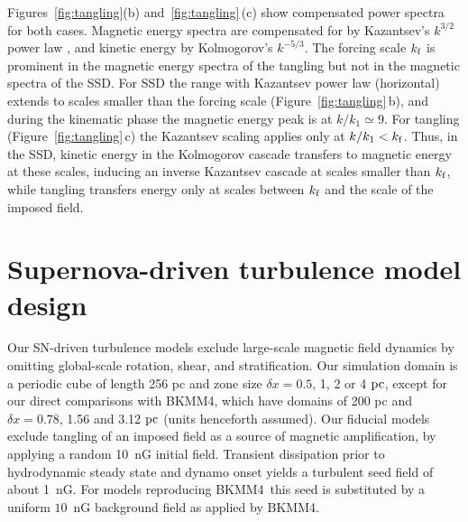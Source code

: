 \documentclass[preprint2]{aastex63}
\newcommand\kf{k_{\rm f} }
\newcommand\pc{~ {\rm pc}}
\newcommand\dx{ {\delta x}}
\newcommand\BKM{{\sf BKMM4}}
\begin{document}
 {Figures~\ref{fig:tangling}(b) and~\ref{fig:tangling}\,(c) show
 compensated power spectra for both cases.}
 Magnetic energy spectra are compensated {for by} Kazantsev's $k^{3/2}$
 {power law} \citep{Sch02,BS14}, and kinetic energy {by} Kolmogorov's
 $k^{-5/3}$.
 The forcing scale $\kf$ is {prominent} in
 the magnetic energy {spectra of the tangling} but
 {not} {in the magnetic spectra of the SSD}.
 {For SSD the range with Kazantsev power law (horizontal) extends to scales
 smaller than the forcing scale (Figure~\ref{fig:tangling}\,b), and during the
 kinematic phase the magnetic energy peak is at $k/k_1\simeq9$.}
 {For tangling (Figure~\ref{fig:tangling}\,c) the Kazantsev
 {scaling} applies only at $k/k_1<\kf$.} 
 Thus, in the SSD, kinetic energy {in the Kolmogorov cascade} transfers to
 {magnetic energy} 
 at these scales, inducing an inverse Kazantsev {cascade}
 at scales {smaller than} $\kf$, while tangling transfers energy only at
 scales between $\kf$ and the scale of the imposed field.
 
\section{{Supernova-driven} turbulence model design} \label{sec:model}

 {Our} SN-driven turbulence models exclude large-scale magnetic field
 dynamics by {omitting global-scale} rotation, shear, and stratification.
 Our simulation domain is a periodic cube of length 256 pc and zone size
 $\dx=0.5$, 1, 2 or 4$\pc${, except for {our} direct comparisons with
 \BKM, { which have} domains {of} 200 pc and $\dx=0.78$, 1.56 and
 3.12$\pc$ (units henceforth assumed)}.
 {Our fiducial models exclude tangling of an imposed field as a source
 of magnetic amplification, by applying a random 10~nG initial field.
 Transient dissipation
     prior to hydrodynamic steady state and dynamo onset yields
a turbulent seed field of about 1~nG.
 For models reproducing \BKM\ this seed is substituted by
 a uniform $10$~nG background field as applied by \BKM.}
\end{document}
